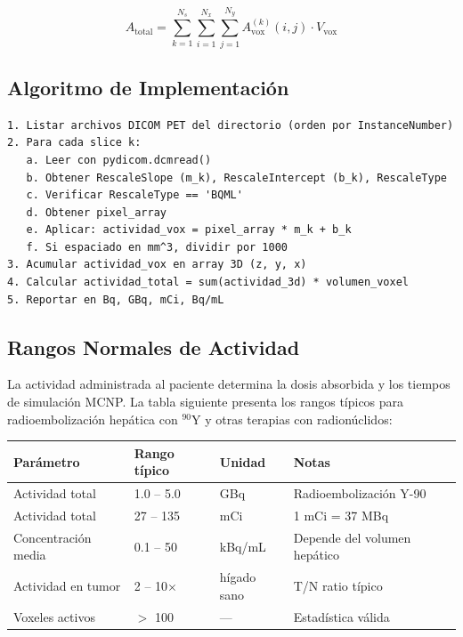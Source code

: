 \documentclass[12pt,a4paper]{article}
\begin{document}
$$A_{\text{total}} = \sum_{k=1}^{N_s} \sum_{i=1}^{N_x} \sum_{j=1}^{N_y} A_{\text{vox}}^{(k)}(i,j) \cdot V_{\text{vox}}$$


\subsection{Algoritmo de Implementación}

\begin{lstlisting}
1. Listar archivos DICOM PET del directorio (orden por InstanceNumber)
2. Para cada slice k:
   a. Leer con pydicom.dcmread()
   b. Obtener RescaleSlope (m_k), RescaleIntercept (b_k), RescaleType
   c. Verificar RescaleType == 'BQML'
   d. Obtener pixel_array
   e. Aplicar: actividad_vox = pixel_array * m_k + b_k
   f. Si espaciado en mm^3, dividir por 1000
3. Acumular actividad_vox en array 3D (z, y, x)
4. Calcular actividad_total = sum(actividad_3d) * volumen_voxel
5. Reportar en Bq, GBq, mCi, Bq/mL
\end{lstlisting}

\subsection{Rangos Normales de Actividad}

La actividad administrada al paciente determina la dosis absorbida y los tiempos de simulación MCNP. La tabla siguiente presenta los rangos típicos para radioembolización hepática con $^{90}$Y y otras terapias con radionúclidos:

\begin{tabular}{p{4cm} p{2.5cm} p{2cm} p{5cm}}
\toprule
\textbf{Parámetro} & \textbf{Rango típico} & \textbf{Unidad} & \textbf{Notas} \\
\midrule
Actividad total & 1.0 -- 5.0 & GBq & Radioembolización Y-90 \\
Actividad total & 27 -- 135 & mCi & 1 mCi = 37 MBq \\
Concentración media & 0.1 -- 50 & kBq/mL & Depende del volumen hepático \\
Actividad en tumor & 2 -- 10$\times$ & hígado sano & T/N ratio típico \\
Voxeles activos & $>$ 100 & --- & Estadística válida \\
\bottomrule
\end{tabular}
\end{document}

